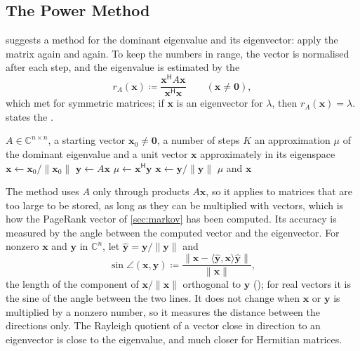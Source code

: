 \subsection{The Power Method}

 suggests a method for the dominant eigenvalue and its eigenvector: apply the matrix again and again. To keep the numbers in range, the vector is normalised after each step, and the eigenvalue is estimated by the 
\[
r_A(\mathbf x)\coloneqq\frac{\mathbf x^{\mathsf H}A\mathbf x}{\mathbf x^{\mathsf H}\mathbf x}\qquad(\mathbf x\ne\mathbf 0),
\]
which  met for symmetric matrices; if $\mathbf x$ is an eigenvector for $\lambda$, then $r_A(\mathbf x)=\lambda$.  states the .

\begin{algorithm}
\begin{algorithmic}[1]
\Require $A\in\mathbb C^{n\times n}$, a starting vector $\mathbf x_0\ne\mathbf 0$, a number of steps $K$
\Ensure an approximation $\mu$ of the dominant eigenvalue and a unit vector $\mathbf x$ approximately in its eigenspace
\State $\mathbf x\gets\mathbf x_0/\|\mathbf x_0\|$
  \State $\mathbf y\gets A\mathbf x$ 
  \State $\mu\gets\mathbf x^{\mathsf H}\mathbf y$ 
  \State $\mathbf x\gets\mathbf y/\|\mathbf y\|$
\EndFor
\State \Return $\mu$ and $\mathbf x$
\end{algorithmic}
\caption{The power method (\cref{thm:power-method}). Each step costs one product of $A$ with a vector, $2n^2-n$ operations for a full real matrix, and about $5n$ further operations; in practice the loop stops when $\mu$ changes little. If $\mathbf y=\mathbf 0$ occurs, $\mathbf x$ is an eigenvector for $0$.}
\label{alg:power-method}
\end{algorithm}

The method uses $A$ only through products $A\mathbf x$, so it applies to matrices that are too large to be stored, as long as they can be multiplied with vectors, which is how the PageRank vector of \cref{sec:markov} has been computed. Its accuracy is measured by the angle between the computed vector and the eigenvector. For nonzero $\mathbf x$ and $\mathbf y$ in $\mathbb C^n$, let $\hat{\mathbf y}=\mathbf y/\|\mathbf y\|$ and
\[
\sin\angle(\mathbf x,\mathbf y)\coloneqq\frac{\|\mathbf x-\langle\hat{\mathbf y},\mathbf x\rangle\hat{\mathbf y}\|}{\|\mathbf x\|},
\]
the length of the component of $\mathbf x/\|\mathbf x\|$ orthogonal to $\mathbf y$ (); for real vectors it is the sine of the angle between the two lines. It does not change when $\mathbf x$ or $\mathbf y$ is multiplied by a nonzero number, so it measures the distance between the directions only. The Rayleigh quotient of a vector close in direction to an eigenvector is close to the eigenvalue, and much closer for Hermitian matrices.

